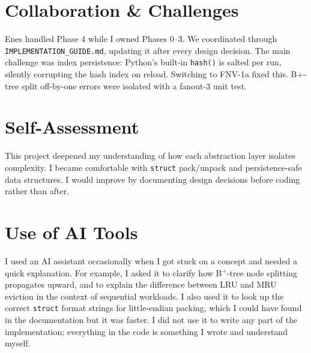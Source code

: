\documentclass[12pt]{article}
\begin{document}
\section{Collaboration \& Challenges}

Enes handled Phase 4 while I owned Phases 0–3. We coordinated through \texttt{IMPLEMENTATION\_GUIDE.md}, updating it after every design decision. The main challenge was index persistence: Python's built-in \texttt{hash()} is salted per run, silently corrupting the hash index on reload. Switching to FNV-1a fixed this. B+-tree split off-by-one errors were isolated with a fanout-3 unit test.

\section{Self-Assessment}

This project deepened my understanding of how each abstraction layer isolates complexity. I became comfortable with \texttt{struct} pack/unpack and persistence-safe data structures. I would improve by documenting design decisions before coding rather than after.

\section{Use of AI Tools}

I used an AI assistant occasionally when I got stuck on a concept and needed a
quick explanation. For example, I asked it to clarify how B$^+$-tree node
splitting propagates upward, and to explain the difference between LRU and MRU
eviction in the context of sequential workloads. I also used it to look up the
correct \texttt{struct} format strings for little-endian packing, which I could
have found in the documentation but it was faster. I did not use it to write any
part of the implementation; everything in the code is something I wrote and
understand myself.
\end{document}
